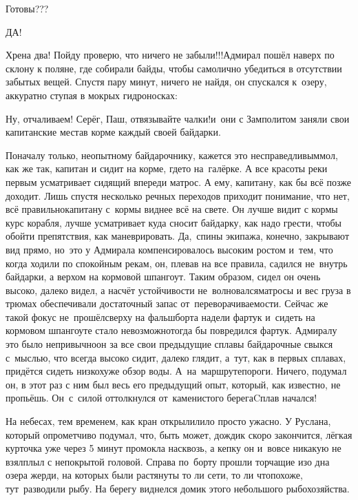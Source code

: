 \diagdash Готовы???

\diagdash ДА!

\diagdash Хрена два! Пойду проверю, что ничего не забыли!!!\mdash Адмирал пошёл наверх по склону к поляне, где собирали байды, чтобы самолично убедиться в отсутствии забытых вещей. Спустя пару минут, ничего не найдя, он спускался к~озеру, аккуратно ступая в мокрых гидроносках:

\diagdash Ну, отчаливаем! Серёг, Паш, отвязывайте чалки!\mdash и~они с Замполитом заняли свои капитанские места\mdash в корме каждый своей байдарки. 

Поначалу только, неопытному байдарочнику, кажется это несправедливым\mdash мол, как же так, капитан и сидит на корме, где\sdash то на~галёрке. А все красоты реки первым усматривает сидящий впереди матрос. А ему, капитану, как бы всё позже доходит. Лишь спустя несколько речных переходов приходит понимание, что нет, всё правильно\mdash капитану с~кормы виднее всё на свете. Он лучше видит с кормы курс корабля, лучше усматривает куда сносит байдарку, как надо грести, чтобы обойти препятствия, как маневрировать. Да,~спины экипажа, конечно, закрывают вид прямо, но~это у Адмирала компенсировалось высоким ростом и~тем, что когда ходили по спокойным рекам, он, плевав на все правила, садился не~внутрь байдарки, а верхом на кормовой шпангоут. Таким образом, сидел он очень высоко, далеко видел, а насчёт устойчивости не~волновался\mdash матросы и вес груза в трюмах обеспечивали достаточный запас от~переворачиваемости. Сейчас же такой фокус не~прошёл\mdash сверху на фальшборта надели фартук и~сидеть на кормовом шпангоуте стало невозможно\mdash тогда бы повредился фартук. Адмиралу это было непривычно\mdash он за все свои предыдущие сплавы байдарочные свыкся с~мыслью, что всегда высоко сидит, далеко глядит, а~тут, как в первых сплавах, придётся сидеть низко\mdash хуже обзор воды. А~на~маршруте\mdash пороги. Ничего, подумал он, в этот раз с ним был весь его предыдущий опыт, который, как известно, не пропьёшь. Он~с~силой оттолкнулся от~каменистого берега\mdash Cплав начался!

На небесах, тем временем, как кран открыли\mdash лило просто ужасно. У Руслана, который опрометчиво подумал, что, быть может, дождик скоро закончится, лёгкая курточка уже через 5 минут промокла насквозь, а кепку он и~вовсе никакую не взял\mdash плыл с непокрытой головой. Справа по~борту прошли торчащие изо дна озера жерди, на которых были растянуты то ли сети, то ли что\mdash похоже, тут~разводили рыбу. На берегу виднелся домик этого небольшого рыбохозяйства.

